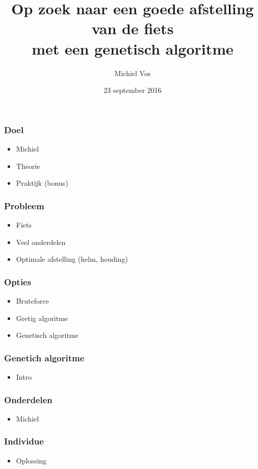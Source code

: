 \documentclass{beamer}
\title{Op zoek naar een goede afstelling van de fiets\\
met een genetisch algoritme}
\author{Michiel Vos}
\date{23 september 2016}
\begin{document}
\begin{frame}
  \titlepage
\end{frame}

\begin{frame}
  \frametitle{Doel}
  \begin{itemize}
      \item Michiel
      \item Theorie
      \item Praktijk (bonus)
  \end{itemize}
\end{frame}

\begin{frame}
  \frametitle{Probleem}
  \begin{itemize}
      \item Fiets 
      \item Veel onderdelen
      \item Optimale afstelling (helm, houding)
  \end{itemize}
\end{frame}

\begin{frame}
  \frametitle{Opties}
  \begin{itemize}
      \item Bruteforce
      \item Gretig algoritme
      \item Genetisch algoritme
  \end{itemize}
\end{frame}

\begin{frame}
  \frametitle{Genetich algoritme}
  \begin{itemize}
      \item Intro
  \end{itemize}
\end{frame}

\begin{frame}
  \frametitle{Onderdelen}
  \begin{itemize}
      \item Michiel
  \end{itemize}
\end{frame}

\begin{frame}
  \frametitle{Individue}
  \begin{itemize}
      \item Oplossing
  \end{itemize}
\end{frame}
\end{document}
